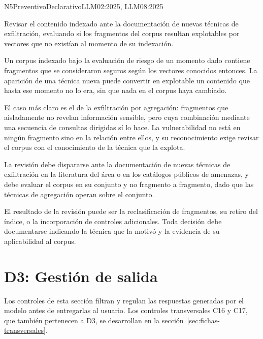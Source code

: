   {N5}{Preventivo}{Declarativo}{LLM02:2025, LLM08:2025}

Revisar el contenido indexado ante la documentación de nuevas técnicas de exfiltración, evaluando si los fragmentos del corpus resultan explotables por vectores que no existían al momento de su indexación.

Un corpus indexado bajo la evaluación de riesgo de un momento dado contiene fragmentos que se consideraron seguros según los vectores conocidos entonces. La aparición de una técnica nueva puede convertir en explotable un contenido que hasta ese momento no lo era, sin que nada en el corpus haya cambiado.

El caso más claro es el de la exfiltración por agregación: fragmentos que aisladamente no revelan información sensible, pero cuya combinación mediante una secuencia de consultas dirigidas sí lo hace. La vulnerabilidad no está en ningún fragmento sino en la relación entre ellos, y su reconocimiento exige revisar el corpus con el conocimiento de la técnica que la explota.

La revisión debe dispararse ante la documentación de nuevas técnicas de exfiltración en la literatura del área o en los catálogos públicos de amenazas, y debe evaluar el corpus en su conjunto y no fragmento a fragmento, dado que las técnicas de agregación operan sobre el conjunto.

El resultado de la revisión puede ser la reclasificación de fragmentos, su retiro del índice, o la incorporación de controles adicionales. Toda decisión debe documentarse indicando la técnica que la motivó y la evidencia de su aplicabilidad al corpus.


\section{D3: Gestión de salida}
\label{sec:fichas-d3}

Los controles de esta sección filtran y regulan las respuestas generadas por el modelo antes de entregarlas al usuario. Los controles transversales C16 y C17, que también pertenecen a D3, se desarrollan en la sección~\ref{sec:fichas-transversales}.

